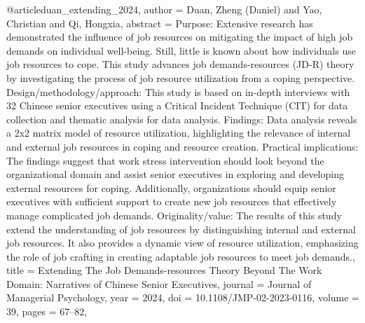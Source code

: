 @article{duan_extending_2024,
  author = {Duan, Zheng (Daniel) and Yao, Christian and Qi, Hongxia},
  abstract = {Purpose: Extensive research has demonstrated the influence of job resources on mitigating the impact of high job demands on individual well-being. Still, little is known about how individuals use job resources to cope. This study advances job demands-resources (JD-R) theory by investigating the process of job resource utilization from a coping perspective. Design/methodology/approach: This study is based on in-depth interviews with 32 Chinese senior executives using a Critical Incident Technique (CIT) for data collection and thematic analysis for data analysis. Findings: Data analysis reveals a 2x2 matrix model of resource utilization, highlighting the relevance of internal and external job resources in coping and resource creation. Practical implications: The findings suggest that work stress intervention should look beyond the organizational domain and assist senior executives in exploring and developing external resources for coping. Additionally, organizations should equip senior executives with sufficient support to create new job resources that effectively manage complicated job demands. Originality/value: The results of this study extend the understanding of job resources by distinguishing internal and external job resources. It also provides a dynamic view of resource utilization, emphasizing the role of job crafting in creating adaptable job resources to meet job demands.},
  title = {{Extending} {The} {Job} {Demands-resources} {Theory} {Beyond} {The} {Work} {Domain}: {Narratives} {of} {Chinese} {Senior} {Executives}},
  journal = {Journal of Managerial Psychology},
  year = {2024},
  doi = {10.1108/JMP-02-2023-0116},
  volume = {39},
  pages = {67--82},
}


